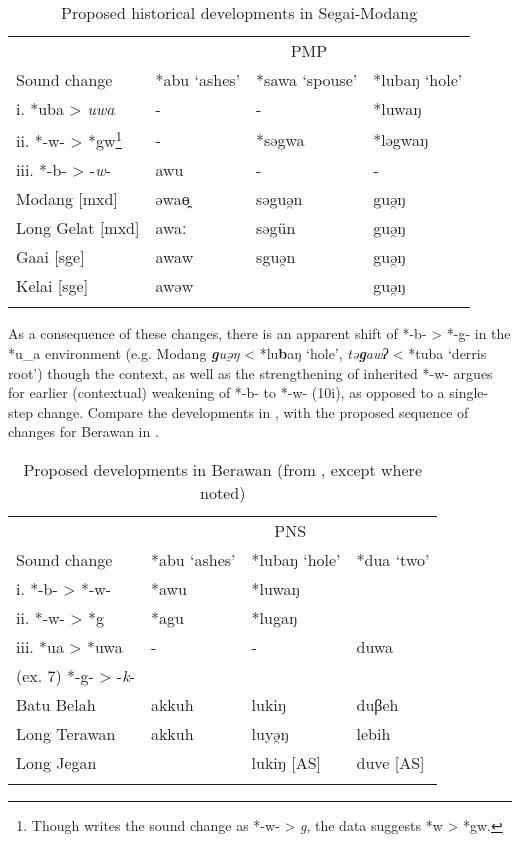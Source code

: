 \documentclass[output=paper]{langscibook}
\begin{document}
\begin{table}%
\caption{Proposed historical developments in Segai-Modang \citep[76--77]{Smith2017}}
\label{tab:ex:blevins:10}
\begin{tabularx}{\textwidth}{XXXl}
\lsptoprule
               &   \multicolumn{3}{c}{PMP}\\\cmidrule(lr){2-4}
Sound change       &  *abu ‘ashes’ & *sawa ‘spouse’  & *lubaŋ ‘hole’\\\midrule
i.   *uba > \textit{uwa}    &   -           &   -             & *luwaŋ\\
ii. *-w- > *gw\footnote{Though \citet[77]{Smith2017} writes the sound change as *-w- > \textit{g}, the data suggests *w > *gw.}
                    &  -      & *səgwa     &  *ləgwaŋ\\
iii. *-b- > -\textit{w}-     &  awu    &   -        &  -\\
Modang [mxd]        &  əwaɵ̯  &     səguə̯n  &   guə̯ŋ\\
Long Gelat [mxd]    &  awaː   &   səgün    & guə̯ŋ\\
Gaai [sge]          & awaw    &  sguə̯n     &  guə̯ŋ\\
Kelai [sge]         & awəw    &            & guə̯ŋ\\
\lspbottomrule
\end{tabularx}
\end{table}

As a consequence of these changes, there is an apparent shift of *-b- > *-g- in the *u\_a environment (e.g. Modang \textbf{\textit{g}}\textit{uə̯ŋ} < *lu\textbf{b}aŋ ‘hole’, \textit{tə}\textbf{\textit{g}}\textit{awʔ} < *tuba ‘derris root’) though the context, as well as the strengthening of inherited *-w- argues for earlier (contextual) weakening of *-b- to *-w- (10i), as opposed to a single-step change. Compare the developments in , with the proposed sequence of changes for Berawan in .

\begin{table}%
\caption{Proposed developments in Berawan (from \citealt{Blust2005}, except where noted)}
\label{tab:ex:blevins:11}
\begin{tabularx}{\textwidth}{XXXl}
\lsptoprule
                 & \multicolumn{3}{c}{PNS}\\\cmidrule(lr){2-4}
Sound change     & *abu ‘ashes’ &  *lubaŋ ‘hole’ &  *dua ‘two’\\\midrule
i.   *-b- > *-w- & *awu  &   *luwaŋ  & \\
ii. *-w- > *g    & *agu  &   *lugaŋ  & \\
iii. *ua > *uwa  &  -    &  -        &  duwa\\
(ex. 7) *-g- > -\textit{k}-\\
Batu Belah      & akkuh  &  lukiŋ      & duβeh\\
Long Terawan    & akkuh  &  luyə̯ŋ      & lebih\\
Long Jegan      &        &  lukiŋ [AS] & duve [AS]\\
\lspbottomrule
\end{tabularx}
\end{table}
\end{document}
